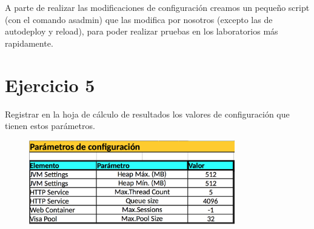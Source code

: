 \documentclass[a4paper, 10pt]{article}
\begin{document}
A parte de realizar las modificaciones de configuración creamos un pequeño script (con el comando asadmin) que las modifica por nosotros (excepto las de autodeploy y reload), para poder realizar pruebas en los laboratorios más rapidamente.


\section{Ejercicio 5}
\begin{mdframed} 
Registrar en la hoja de cálculo de resultados los valores de configuración que tienen estos 
parámetros.
\end{mdframed}
\begin{figure}[hbtp]
	 	\centering
	 	\includegraphics[width=0.8\textwidth]{../../p2/pantallazos/ej5.png}
	 	\caption{}
\end{figure}


\pagebreak
\end{document}
